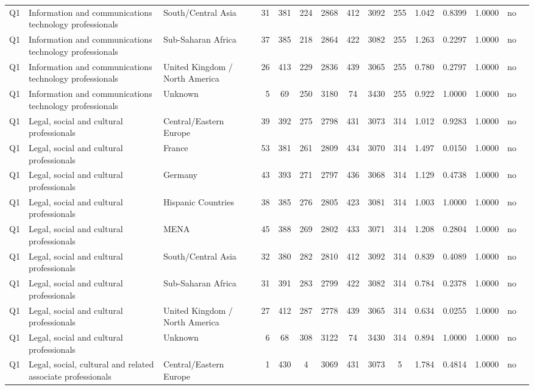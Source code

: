 \begin{longtable}{lllrcccccccccll}
Q1 & Information and communications technology professionals & South/Central Asia & 31 & 381 & 224 & 2868 & 412 & 3092 & 255 & 1.042 & 0.8399 & 1.0000 & no \\
Q1 & Information and communications technology professionals & Sub-Saharan Africa & 37 & 385 & 218 & 2864 & 422 & 3082 & 255 & 1.263 & 0.2297 & 1.0000 & no \\
Q1 & Information and communications technology professionals & United Kingdom / North America & 26 & 413 & 229 & 2836 & 439 & 3065 & 255 & 0.780 & 0.2797 & 1.0000 & no \\
Q1 & Information and communications technology professionals & Unknown & 5 & 69 & 250 & 3180 & 74 & 3430 & 255 & 0.922 & 1.0000 & 1.0000 & no \\
Q1 & Legal, social and cultural professionals & Central/Eastern Europe & 39 & 392 & 275 & 2798 & 431 & 3073 & 314 & 1.012 & 0.9283 & 1.0000 & no \\
Q1 & Legal, social and cultural professionals & France & 53 & 381 & 261 & 2809 & 434 & 3070 & 314 & 1.497 & 0.0150 & 1.0000 & no \\
Q1 & Legal, social and cultural professionals & Germany & 43 & 393 & 271 & 2797 & 436 & 3068 & 314 & 1.129 & 0.4738 & 1.0000 & no \\
Q1 & Legal, social and cultural professionals & Hispanic Countries & 38 & 385 & 276 & 2805 & 423 & 3081 & 314 & 1.003 & 1.0000 & 1.0000 & no \\
Q1 & Legal, social and cultural professionals & MENA & 45 & 388 & 269 & 2802 & 433 & 3071 & 314 & 1.208 & 0.2804 & 1.0000 & no \\
Q1 & Legal, social and cultural professionals & South/Central Asia & 32 & 380 & 282 & 2810 & 412 & 3092 & 314 & 0.839 & 0.4089 & 1.0000 & no \\
Q1 & Legal, social and cultural professionals & Sub-Saharan Africa & 31 & 391 & 283 & 2799 & 422 & 3082 & 314 & 0.784 & 0.2378 & 1.0000 & no \\
Q1 & Legal, social and cultural professionals & United Kingdom / North America & 27 & 412 & 287 & 2778 & 439 & 3065 & 314 & 0.634 & 0.0255 & 1.0000 & no \\
Q1 & Legal, social and cultural professionals & Unknown & 6 & 68 & 308 & 3122 & 74 & 3430 & 314 & 0.894 & 1.0000 & 1.0000 & no \\
Q1 & Legal, social, cultural and related associate professionals & Central/Eastern Europe & 1 & 430 & 4 & 3069 & 431 & 3073 & 5 & 1.784 & 0.4814 & 1.0000 & no \\

\end{longtable}
